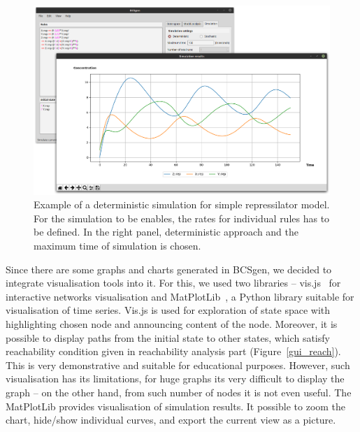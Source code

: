\documentclass[12pt]{fithesis2}
\begin{document}
\begin{figure}[!h]
\begin{center}
\includegraphics[scale=0.23]{pics/BCSgen_simulation}
\caption{Example of a deterministic simulation for simple repressilator model. For the simulation to be enables, the rates for individual rules has to be defined. In the right panel, deterministic approach and the maximum time of simulation is chosen.}\label{gui_simulation}
\end{center}
\end{figure}

Since there are some graphs and charts generated in BCSgen, we decided to integrate visualisation tools into it. For this, we used two libraries -- vis.js~\cite{almende2016vis} for interactive networks visualisation and MatPlotLib~\cite{hunter2007matplotlib}, a Python library suitable for visualisation of time series. Vis.js is used for exploration of state space with highlighting chosen node and announcing content of the node. Moreover, it is possible to display paths from the initial state to other states, which satisfy reachability condition given in reachability analysis part (Figure~\ref{gui_reach}). This is very demonstrative and suitable for educational purposes. However, such visualisation has its limitations, for huge graphs its very difficult to display the graph -- on the other hand, from such number of nodes it is not even useful. The MatPlotLib provides visualisation of simulation results. It possible to zoom the chart, hide/show individual curves, and export the current view as a picture.
\end{document}

